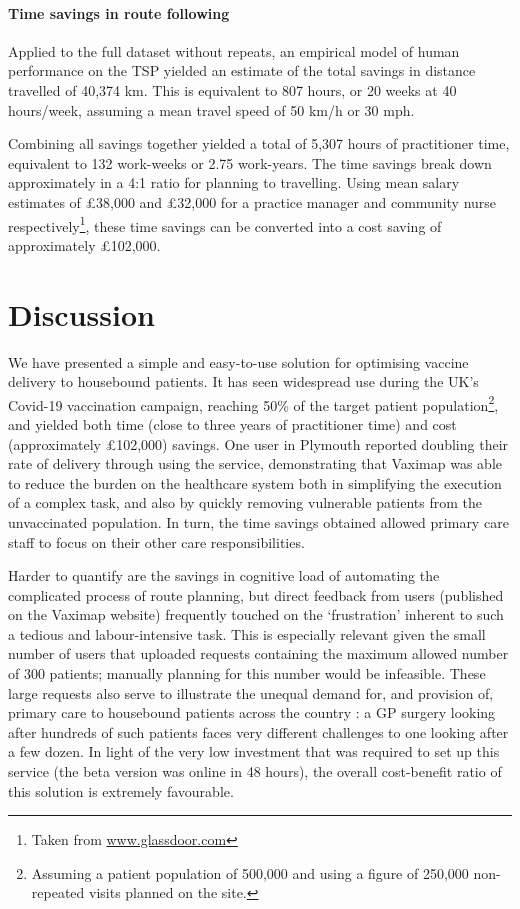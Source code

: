 \documentclass{article}
\def\vm{Vaximap}
\begin{document}
\paragraph{Time savings in route following}
Applied to the full dataset without repeats, an empirical model of human performance on the TSP yielded an estimate of the total savings in distance travelled of 40,374 km. This is equivalent to 807 hours, or 20 weeks at 40 hours/week, assuming a mean travel speed of 50 km/h or 30 mph.

Combining all savings together yielded a total of 5,307 hours of practitioner time, equivalent to 132 work-weeks or 2.75 work-years. The time savings break down approximately in a 4:1 ratio for planning to travelling. Using mean salary estimates of £38,000 and £32,000 for a practice manager and community nurse respectively\footnote{Taken from \hyperlink{www.glassdoor.com}{www.glassdoor.com}}, these time savings can be converted into a cost saving of approximately £102,000. 

\section{Discussion}

We have presented a simple and easy-to-use solution for optimising vaccine delivery to housebound patients. It has seen widespread use during the UK's Covid-19 vaccination campaign, reaching 50\% of the target patient population\footnote{Assuming a patient population of 500,000 and using a figure of 250,000 non-repeated visits planned on the site.}, and yielded both time (close to three years of practitioner time) and cost (approximately £102,000) savings. One user in Plymouth reported doubling their rate of delivery through using the service, demonstrating that \vm{} was able to reduce the burden on the healthcare system both in simplifying the execution of a complex task, and also by quickly removing vulnerable patients from the unvaccinated population. In turn, the time savings obtained allowed primary care staff to focus on their other care responsibilities. 

Harder to quantify are the savings in cognitive load of automating the complicated process of route planning, but direct feedback from users (published on the \vm{} website) frequently touched on the `frustration' inherent to such a tedious and labour-intensive task. This is especially relevant given the small number of users that uploaded requests containing the maximum allowed number of 300 patients; manually planning for this number would be infeasible. These large requests also serve to illustrate the unequal demand for, and provision of, primary care to housebound patients across the country \cite{Rolewicz2021}: a GP surgery looking after hundreds of such patients faces very different challenges to one looking after a few dozen. In light of the very low investment that was required to set up this service (the beta version was online in 48 hours), the overall cost-benefit ratio of this solution is extremely favourable. 
\end{document}
